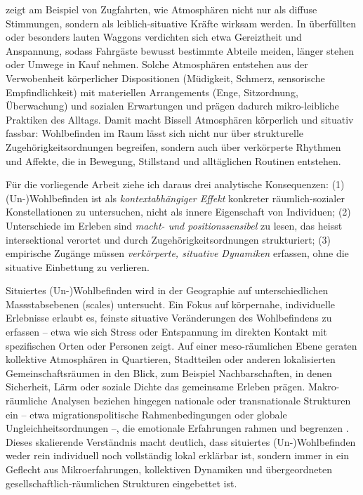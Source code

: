 \textcite{bissellPassengerMobilitiesAffective2010} zeigt am Beispiel von Zugfahrten, wie Atmosphären nicht nur als diffuse Stimmungen, sondern als leiblich-situative Kräfte wirksam werden. In überfüllten oder besonders lauten Waggons verdichten sich etwa Gereiztheit und Anspannung, sodass Fahrgäste bewusst bestimmte Abteile meiden, länger stehen oder Umwege in Kauf nehmen. Solche Atmosphären entstehen aus der Verwobenheit körperlicher Dispositionen (Müdigkeit, Schmerz, sensorische Empfindlichkeit) mit materiellen Arrangements (Enge, Sitzordnung, Überwachung) und sozialen Erwartungen und prägen dadurch mikro-leibliche Praktiken des Alltags. Damit macht Bissell Atmosphären körperlich und situativ fassbar: Wohlbefinden im Raum lässt sich nicht nur über strukturelle Zugehörigkeitsordnungen begreifen, sondern auch über verkörperte Rhythmen und Affekte, die in Bewegung, Stillstand und alltäglichen Routinen entstehen.

Für die vorliegende Arbeit ziehe ich daraus drei analytische Konsequenzen: (1) (Un\nobreakdash-)Wohlbefinden ist als \emph{kontextabhängiger Effekt} konkreter räumlich-sozialer Konstellationen zu untersuchen, nicht als innere Eigenschaft von Individuen; (2) Unterschiede im Erleben sind \emph{macht- und positionssensibel} zu lesen, das heisst intersektional verortet und durch Zugehörigkeitsordnungen strukturiert; (3) empirische Zugänge müssen \emph{verkörperte, situative Dynamiken} erfassen, ohne die situative Einbettung zu verlieren.

\vspace{1em}

Situiertes (Un\nobreakdash-)Wohlbefinden wird in der Geographie auf unterschiedlichen Massstabsebenen (scales) untersucht. Ein Fokus auf körpernahe, individuelle Erlebnisse erlaubt es, feinste situative Veränderungen des Wohlbefindens zu erfassen -- etwa wie sich Stress oder Entspannung im direkten Kontakt mit spezifischen Orten oder Personen zeigt. Auf einer meso-räumlichen Ebene geraten kollektive Atmosphären in Quartieren, Stadtteilen oder anderen lokalisierten Gemeinschaftsräumen in den Blick, zum Beispiel Nachbarschaften, in denen Sicherheit, Lärm oder soziale Dichte das gemeinsame Erleben prägen. Makro-räumliche Analysen beziehen hingegen nationale oder transnationale Strukturen ein -- etwa migrationspolitische Rahmenbedingungen oder globale Ungleichheitsordnungen --, die emotionale Erfahrungen rahmen und begrenzen \parencite{howittScaleRelationMusical1998,marstonHumanGeographyScale2005}. Dieses skalierende Verständnis macht deutlich, dass situiertes (Un\nobreakdash-)Wohlbefinden weder rein individuell noch vollständig lokal erklärbar ist, sondern immer in ein Geflecht aus Mikroerfahrungen, kollektiven Dynamiken und übergeordneten gesellschaftlich-räumlichen Strukturen eingebettet ist.

